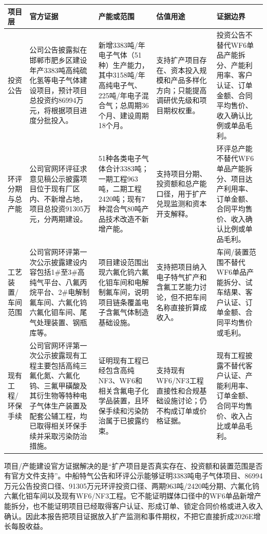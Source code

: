 \begin{exhibitbox}[项目/产能建设官方证据]
\scriptsize
\begin{tabularx}{\exhibitboxwidth}{L{1.5cm} X X X X}
\toprule
\textbf{项目层} & \textbf{官方证据} & \textbf{产能或范围} & \textbf{估值用途} & \textbf{证据边界} \\
\midrule
投资公告 & 公司公告披露拟在邯郸市肥乡区建设年产3383吨高纯硫化氢等电子气体建设项目，预计项目总投资约86994万元，将根据项目进度分批投入。 & 新增3383吨/年电子气体（51种）生产能力，其中3158吨/年高纯电子气、225吨/年电子混合气；总周期36个月、建设周期18个月。 & 支持扩产项目存在、资本投入规模和产品多样化方向；只能提高调研优先级和项目期权权重。 & 投资公告不替代WF6单品产能拆分、产能利用率、客户认证、订单金额、合同平均售价、收入确认比例或单品毛利。 \\
环评分期与总产能 & 公司官网环评征求意见稿公示披露项目位于现有厂区内、不新增占地，项目总投资91305万元，分两期建设。 & 51种各类电子气体合计3383吨；一期工程963吨，二期工程2420吨；现有7种混合气80吨产品技术改造不新增产能。 & 支持项目分期、投资额和总产能口径，用于扩产兑现监测和资本开支解释。 & 环评总产能不替代WF6单品产能拆分、项目达产利用率、订单金额、合同平均售价、收入确认比例或单品毛利。 \\
工艺装置/车间范围 & 公司官网环评第一次公示披露建设内容包括1\#至3\#高纯气平台、八氟丙烷平台、2\#电解制氟车间、六氟化钨六氟化钼车间、尾气处理装置、钢瓶库等。 & 项目建设范围出现六氟化钨六氟化钼车间和电解制氟车间，说明项目链条覆盖电子含氟气体制造基础设施。 & 支持把项目纳入电子特气扩产和含氟工艺能力讨论，但不把车间名称直接折算成收入。 & 车间/装置范围不替代WF6单品产能拆分、试车结果、客户认证、订单金额、合同平均售价或毛利。 \\
现有工程/环保手续 & 公司官网环评第一次公示披露现有工程主要包括高纯三氟化氮、六氟化钨、三氟甲磺酸及其衍生物等特种电子气体生产装置及配套公辅工程，均已取得相关环保手续并采取污染防治措施。 & 证明现有工程已经包含高纯NF3、WF6和相关含氟电子化学品装置，且环保手续和污染防治属于已披露约束。 & 支持现有WF6/NF3工程直接性和合规基础设施讨论；仍不构成订单或价格证据。 & 现有工程披露不替代客户认证、产能利用率、订单金额、合同平均售价、收入占比或单品毛利。 \\
\bottomrule
\end{tabularx}
\end{exhibitbox}

项目/产能建设官方证据解决的是“扩产项目是否真实存在、投资额和装置范围是否有官方文件支持”。中船特气公告和环评公示能够证明3383吨电子气体项目、86994万元公告投资口径、91305万元环评投资口径、两期963吨/2420吨分期、六氟化钨六氟化钼车间以及现有WF6/NF3工程。它不能证明媒体口径中的WF6单品新增产能拆分，也不能证明项目已经取得客户认证、形成订单、锁定合同价格或进入收入确认。因此本报告把项目证据放入扩产监测和事件期权，不把它直接折成2026E增长每股收益。

